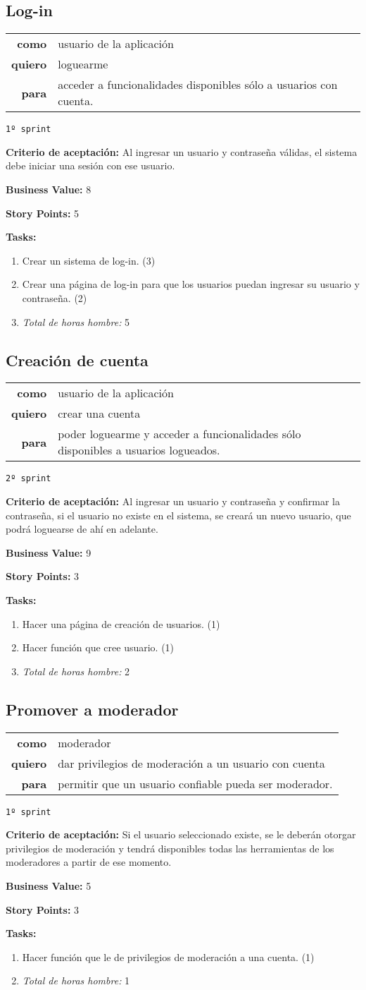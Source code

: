 \documentclass[hidelinks,a4paper,11pt, nofootinbib]{article}
\newcommand{\userstory}[3]{
\begin{tabular}{|r p{10cm}|}
  \hline
  \textbf{como} & #1 \\
  \textbf{quiero} & #2 \\
  \textbf{para} & #3 \\
  \hline
\end{tabular}

}
\newcommand{\critdeacep}[1]{\textbf{Criterio de aceptación:} #1

}
\newcommand{\busvalue}[1]{\textbf{Business Value:} #1

}
\newcommand{\storypoints}[1]{\textbf{Story Points:} #1

}
\newcommand{\primersprint}{\texttt{1º sprint}

}
\newcommand{\segundosprint}{\texttt{2º sprint}

}
\newcommand{\tasks}[1]{\textbf{Tasks:} 

#1}
\begin{document}
\subsection*{Log-in}
\userstory{usuario de la aplicación}{loguearme}{acceder a funcionalidades disponibles sólo a usuarios con cuenta.}
\primersprint
\critdeacep{Al ingresar un usuario y contraseña válidas, el sistema debe iniciar una sesión con ese usuario.}
\busvalue{8}
\storypoints{5}
\tasks{
  \begin{enumerate}
    \item Crear un sistema de log-in. (3)
    \item Crear una página de log-in para que los usuarios puedan ingresar su usuario y contraseña. (2)
    \item[] \textit{Total de horas hombre:} 5
  \end{enumerate}
}

\subsection*{Creación de cuenta}
\userstory{usuario de la aplicación}{crear una cuenta}{poder loguearme y acceder a funcionalidades sólo disponibles a usuarios logueados.}
\segundosprint
\critdeacep{Al ingresar un usuario y contraseña y confirmar la contraseña, si el usuario no existe en el sistema, se creará un nuevo usuario, que podrá loguearse de ahí en adelante.}
\busvalue{9}
\storypoints{3}
\tasks{
  \begin{enumerate}
    \item Hacer una página de creación de usuarios. (1)
    \item Hacer función que cree usuario. (1)
    \item[] \textit{Total de horas hombre:} 2
  \end{enumerate}
}

\subsection*{Promover a moderador}
\userstory{moderador}{dar privilegios de moderación a un usuario con cuenta}{permitir que un usuario confiable pueda ser moderador.}
\primersprint
\critdeacep{Si el usuario seleccionado existe, se le deberán otorgar privilegios de moderación y tendrá disponibles todas las herramientas de los moderadores a partir de ese momento.}
\busvalue{5}
\storypoints{3}
\tasks{
  \begin{enumerate}
    \item Hacer función que le de privilegios de moderación a una cuenta. (1)
    \item[] \textit{Total de horas hombre:} 1
  \end{enumerate}
}
\end{document}
